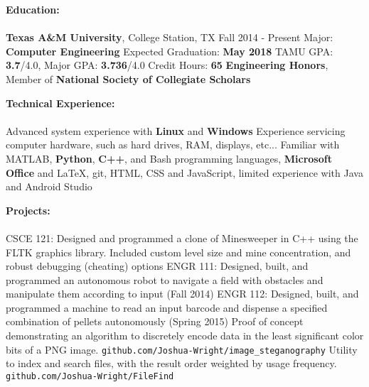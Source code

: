 \documentclass[12pt]{article}
\newcommand{\upspace}{\vspace{0px}}
\newcommand{\zzz}[1]{\upspace \0 \textbf{#1} \\ \vspace{-0.8\baselineskip} \hrulefill \vspace{-2px} \\ }
\newcommand{\aaa}{\upspace \1}
\newcommand{\bbb}{\upspace \2}
\begin{document}
\begin{flushleft}
\begin{outline}[compactitem]

\zzz{Education:}
	\aaa \textbf{Texas A\&M University}, College Station, TX \hfill Fall 2014 - Present
		\bbb Major: \textbf{Computer Engineering}
		\bbb Expected Graduation: \textbf{May 2018}
		\bbb TAMU GPA: \textbf{3.7}/4.0, Major GPA: \textbf{3.736}/4.0
		\bbb Credit Hours: \textbf{65}
		\bbb \textbf{Engineering Honors}, Member of \textbf{National Society of Collegiate Scholars}

\zzz{Technical Experience:}
	\aaa Advanced system experience with \textbf{Linux} and \textbf{Windows}
	\aaa Experience servicing computer hardware, such as hard drives, RAM, displays, etc...
	\aaa Familiar with MATLAB, \textbf{Python}, \textbf{C++}, and Bash programming languages, 
	\textbf{Microsoft Office} and LaTeX, git, HTML, CSS and JavaScript, limited experience with Java and Android Studio

\zzz{Projects:}
	\aaa CSCE 121: Designed and programmed a clone of Minesweeper in C++ using the FLTK graphics library. Included custom level size and mine concentration, and robust debugging (cheating) options
	\aaa ENGR 111: Designed, built, and programmed an autonomous robot to navigate 
	a field with obstacles and manipulate them according to input (Fall 2014)
	\aaa ENGR 112: Designed, built, and programmed a machine to read an input 
	barcode and dispense a specified combination of pellets autonomously (Spring 2015)
	\aaa Proof of concept demonstrating an algorithm to discretely encode data in the least significant color bits of a PNG image.
		\verb|github.com/Joshua-Wright/image_steganography|
	\aaa Utility to index and search files, with the result order weighted by usage frequency.
		\verb|github.com/Joshua-Wright/FileFind|


\end{outline}
\end{flushleft}
\end{document}
